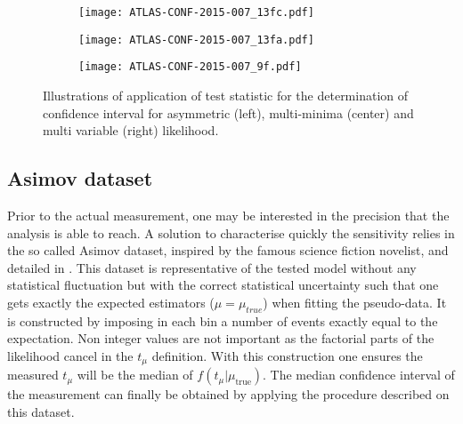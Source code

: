 \begin{figure}[htbp]
\begin{subfigure}[t]{0.32\linewidth}
\begin{center}
\texttt{[image: ATLAS-CONF-2015-007\_13fc.pdf]}
\end{center}
\end{subfigure}
\begin{subfigure}[t]{0.32\linewidth}
\begin{center}
\texttt{[image: ATLAS-CONF-2015-007\_13fa.pdf]}
\end{center}
\end{subfigure}
\begin{subfigure}[t]{0.32\linewidth}
\begin{center}
\texttt{[image: ATLAS-CONF-2015-007\_9f.pdf]}
\end{center}
\end{subfigure}
\caption{\label{orgb73d0b1}
Illustrations of application of test statistic for the determination of confidence interval for asymmetric (left), multi-minima (center) and multi variable (right) likelihood.\cite{ATLAS-CONF-2015-007}}
\end{figure}


\subsection{Asimov dataset}
  \label{sec:org561a813}

Prior to the actual measurement, one may be interested in the precision that the analysis is able to reach.
A solution to characterise quickly the sensitivity relies in the so called Asimov dataset, inspired by the famous science fiction novelist, and detailed in \cite{Cowan:1071727}.
This dataset is representative of the tested model without any statistical fluctuation but with the correct statistical uncertainty such that one gets exactly the expected estimators (\(\hat{\mu}=\mu_{true}\)) when fitting the pseudo-data.
It is constructed by imposing in each bin a number of events exactly equal to the expectation.
Non integer values are not important as the factorial parts of the likelihood cancel in the $t_\mu$ definition.
With this construction one ensures the measured $t_\mu$ will be the median of $f(t_{\mu}|\mu_{\text{true}})$.
The median confidence interval of the measurement can finally be obtained by applying the procedure described on this dataset.
